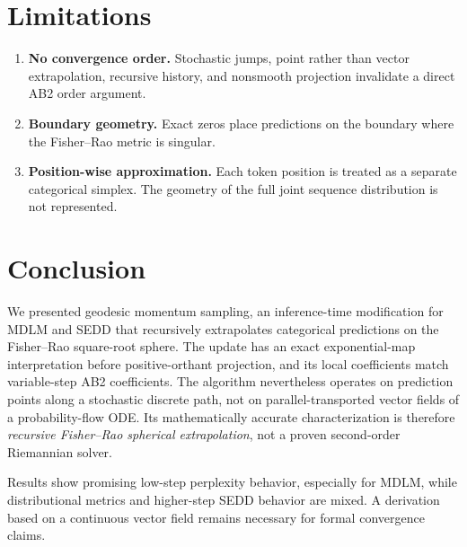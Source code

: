 \documentclass[10pt]{article}
\begin{document}
\section{Limitations}

\begin{enumerate}
  \item \textbf{No convergence order.} Stochastic jumps, point rather than vector extrapolation, recursive
  history, and nonsmooth projection invalidate a direct AB2 order argument.
  \item \textbf{Boundary geometry.} Exact zeros place predictions on the boundary where the Fisher--Rao
  metric is singular.
  \item \textbf{Position-wise approximation.} Each token position is treated as a separate categorical
  simplex.  The geometry of the full joint sequence distribution is not represented.
\end{enumerate}

\section{Conclusion}

We presented geodesic momentum sampling, an inference-time modification for MDLM and SEDD that
recursively extrapolates categorical predictions on the Fisher--Rao square-root sphere.  The update has an
exact exponential-map interpretation before positive-orthant projection, and its local coefficients match
variable-step AB2 coefficients.  The algorithm nevertheless operates on prediction points along a stochastic
discrete path, not on parallel-transported vector fields of a probability-flow ODE.  Its mathematically
accurate characterization is therefore \emph{recursive Fisher--Rao spherical extrapolation}, not a proven
second-order Riemannian solver.

Results show promising low-step perplexity behavior, especially for MDLM, while distributional metrics and
higher-step SEDD behavior are mixed.  A derivation based on a continuous vector field remains necessary for
formal convergence claims.



\end{document}
